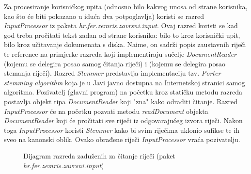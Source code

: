 \documentclass[times, utf8, zavrsni, numeric]{fer}
\begin{document}
Za procesiranje korisničkog upita (odnosno bilo kakvog unosa od strane korisnika, kao što će biti pokazano u iduća dva potpoglavlja) koristi se razred \textit{InputProcessor} iz paketa \textit{hr.fer.zemris.zavrsni.input}. Ovaj razred koristi se kad god treba pročitati tekst zadan od strane korisnika: bilo to kroz korisnički upit, bilo kroz učitavanje dokumenata s diska. Naime, on sadrži popis zaustavnih riječi te reference na primjerke razreda koji implementiraju sučelje \textit{DocumentReader} (kojemu se delegira posao samog čitanja riječi) i  (kojemu se delegira posao stemanja riječi). Razred \textit{Stemmer} predstavlja implementaciju tzv. \textit{Porter stemming algorithm} koja je u Javi javno dostupna na Internetskoj stranici samog algoritma.
Pozivatelj (glavni program) na početku kroz statičku metodu razreda postavlja objekt tipa \textit{DocumentReader} koji "zna" kako odraditi čitanje. Razred \textit{InputProcessor} će na početku pozvati metodu \textit{readDocument} objekta \textit{DocumentReader} koji će pročitati sve riječi iz odgovarajućeg izvora riječi. Nakon toga \textit{InputProcessor} koristi \textit{Stemmer} kako bi svim riječima uklonio sufikse te ih sveo na kanonski oblik. Ovako obrađene riječi \textit{InputProcessor} vraća pozivatelju.
\begin{figure}
\caption{Dijagram razreda zaduženih za čitanje riječi (paket \textit{hr.fer.zemris.zavrsni.input})}
\label{img:diagram}
\end{figure}
\end{document}
